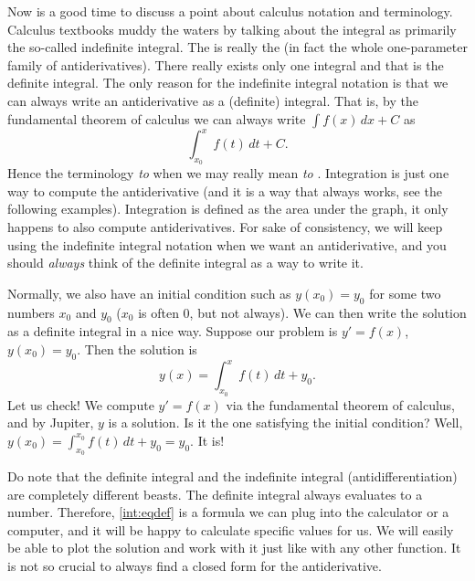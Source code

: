Now is a good time to discuss a point about
calculus notation and terminology.  Calculus
textbooks muddy the waters by talking about the integral as primarily the
so-called indefinite integral.  The 
is really the \emph{} 
(in fact the whole one-parameter family
of antiderivatives).  There really exists only one integral and that
is the definite integral.
The only reason for the indefinite integral notation is that we can always
write an antiderivative as a (definite) integral.  That is, by the fundamental
theorem of calculus we can always write
$\int f(x) \,dx + C$ as
\begin{equation*}
\int_{x_0}^x f(t) \,dt + C .
\end{equation*}
Hence the terminology \emph{to } when we may really mean
\emph{to }.
Integration is just one way to compute the
antiderivative (and it is a way that always works, see the following
examples).  Integration is defined as the area under the graph, it
only happens to also compute antiderivatives.
For sake of consistency, we will keep using the
indefinite integral notation when we want an antiderivative,
and you should \emph{always} think of the definite integral
as a way to write it.

Normally, we also have an initial condition such as $y(x_0) = y_0$
for some two numbers $x_0$ and $y_0$ ($x_0$ is often 0, but not always).
We can then write the solution as a definite integral in a nice way.
Suppose our problem is $y' = f(x)$, $y(x_0) = y_0$.  Then the solution is
\begin{equation} \label{int:eqdef}
y(x) = \int_{x_0}^x f(t) \,dt + y_0 .
\end{equation}
Let us check!
We compute
$y' = f(x)$ via the fundamental theorem of calculus, and by Jupiter, $y$ is a
solution.  Is it the one satisfying the initial condition?  Well,
$y(x_0) = \int_{x_0}^{x_0} f(t)\,dt + y_0 = y_0$.  It is!

Do note that the definite integral and the indefinite integral
(antidifferentiation) are completely different beasts.  The definite integral
always evaluates to a number.  Therefore, \eqref{int:eqdef} is a formula we
can plug into the calculator or a computer, and it will be happy to calculate
specific values for us.  We will easily be able to plot the
solution and work with it just like with any other function.
It is not so crucial to always find a
closed form for the antiderivative.

